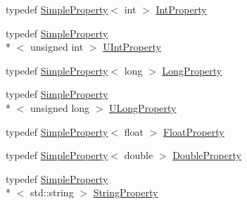 \begin{DoxyCompactItemize}
\item 
typedef \hyperlink{classmaudio_1_1SimpleProperty}{Simple\-Property}$<$ int $>$ \hyperlink{namespacemaudio_aa573bfbf875a5e5678fa6d934084cc47}{Int\-Property}
\item 
typedef \hyperlink{classmaudio_1_1SimpleProperty}{Simple\-Property}\\*
$<$ unsigned int $>$ \hyperlink{namespacemaudio_a627db6d6ab669540c7aed4c1ac62f6ab}{U\-Int\-Property}
\item 
typedef \hyperlink{classmaudio_1_1SimpleProperty}{Simple\-Property}$<$ long $>$ \hyperlink{namespacemaudio_af2bf8df1a7c9b8e1c1b3efc6619bc11e}{Long\-Property}
\item 
typedef \hyperlink{classmaudio_1_1SimpleProperty}{Simple\-Property}\\*
$<$ unsigned long $>$ \hyperlink{namespacemaudio_af8219a4ace76031cdefd1a8ac5cbf301}{U\-Long\-Property}
\item 
typedef \hyperlink{classmaudio_1_1SimpleProperty}{Simple\-Property}$<$ float $>$ \hyperlink{namespacemaudio_a16d55dea341845809a721d83bfac26de}{Float\-Property}
\item 
typedef \hyperlink{classmaudio_1_1SimpleProperty}{Simple\-Property}$<$ double $>$ \hyperlink{namespacemaudio_a6fddf715e71e9788beac91a457c79bc1}{Double\-Property}
\item 
typedef \hyperlink{classmaudio_1_1SimpleProperty}{Simple\-Property}\\*
$<$ std\-::string $>$ \hyperlink{namespacemaudio_aeff9567f322e0c11390c5f9627c43eeb}{String\-Property}
\end{DoxyCompactItemize}
